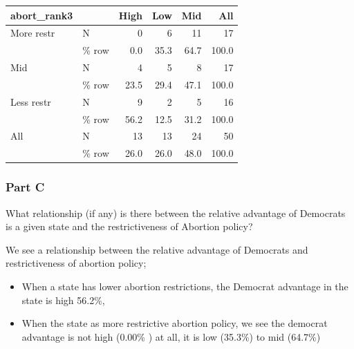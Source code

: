 \documentclass[
  letterpaper,
  DIV=11,
  numbers=noendperiod]{scrartcl}
\begin{document}
\begin{table}
\centering
\begin{tabular}[t]{llrrrr}
\toprule
abort\_rank3 &   & High & Low & Mid & All\\
\midrule
More restr & N & 0 & 6 & 11 & 17\\
 & \% row & \num{0.0} & \num{35.3} & \num{64.7} & \num{100.0}\\
Mid & N & 4 & 5 & 8 & 17\\
 & \% row & \num{23.5} & \num{29.4} & \num{47.1} & \num{100.0}\\
Less restr & N & 9 & 2 & 5 & 16\\
 & \% row & \num{56.2} & \num{12.5} & \num{31.2} & \num{100.0}\\
All & N & 13 & 13 & 24 & 50\\
 & \% row & \num{26.0} & \num{26.0} & \num{48.0} & \num{100.0}\\
\bottomrule
\end{tabular}
\end{table}

\hypertarget{part-c}{%
\subsubsection{Part C}\label{part-c}}

What relationship (if any) is there between the relative advantage of
Democrats is a given state and the restrictiveness of Abortion policy?

We see a relationship between the relative advantage of Democrats and
restrictiveness of abortion policy;

\begin{itemize}
\item
  When a state has lower abortion restrictions, the Democrat advantage
  in the state is high 56.2\%,
\item
  When the state as more restrictive abortion policy, we see the
  democrat advantage is not high (0.00\% ) at all, it is low (35.3\%) to
  mid (64.7\%)
\end{itemize}
\end{document}
